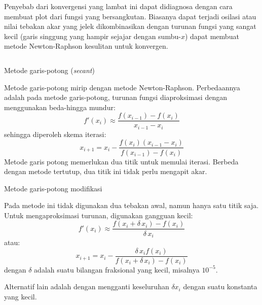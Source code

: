 \begin{frame}
\begin{columns}
\begin{column}{0.5\textwidth}
  Penyebab dari konvergensi yang lambat ini dapat didiagnosa
  dengan cara membuat plot dari fungsi yang bersangkutan.
  Biasanya dapat terjadi osilasi atau nilai tebakan akar yang
  jelek dikombinasikan dengan turunan fungsi yang sangat kecil
  (garis singgung yang hampir sejajar dengan sumbu-$x$)
  dapat membuat metode Newton-Raphson kesulitan untuk konvergen.

  \end{column}

\end{columns}

\end{frame}


\begin{frame}{Metode garis-potong (\textit{secant})}

Metode garis-potong mirip dengan metode Newton-Raphson. Perbedaannya
adalah pada metode garis-potong, turunan fungsi diaproksimasi dengan menggunakan
beda-hingga mundur:
$$
f'(x_{i}) \approx \frac{f(x_{i-1}) - f(x_i)}{x_{i-1} - x_{i}}
$$
sehingga diperoleh skema iterasi:
$$
x_{i+1} = x_{i} - \frac{f(x_{i}) (x_{i-1} - x_{i})}{f(x_{i-1}) - f(x_{i})}
$$
Metode garis potong memerlukan dua titik untuk memulai iterasi. Berbeda dengan
metode tertutup, dua titik ini tidak perlu mengapit akar.

\end{frame}



\begin{frame}{Metode garis-potong modifikasi}

Pada metode ini tidak digunakan dua tebakan awal, namun hanya satu titik saja.
Untuk mengaproksimasi turunan, digunakan gangguan kecil:
$$
f'(x_i) \approx \frac{f(x_i + \delta \, x_{i}) - f(x_i)}{\delta \, x_{i}}
$$
atau:
$$
x_{i+1} = x_{i} - \frac{\delta \, x_{i} f(x_i)}{f(x_{i} + \delta \, x_i) - f(x_i)}
$$
dengan $\delta$ adalah suatu bilangan fraksional yang kecil, misalnya $10^{-5}$.

Alternatif lain adalah dengan mengganti keseluruhan $\delta x_{i}$
dengan suatu konstanta yang kecil.

\end{frame}